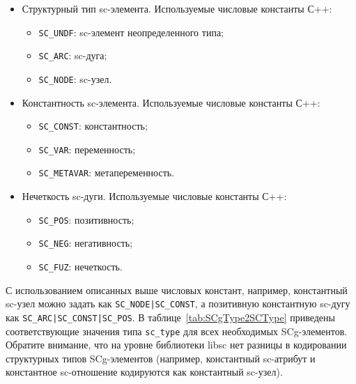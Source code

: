 \begin{itemize}
\item Структурный тип sc-элемента. Используемые числовые константы
  С++:
  \begin{itemize}
  \item \lstinline{SC_UNDF}: sc-элемент неопределенного типа;
  \item \lstinline{SC_ARC}: sc-дуга;
  \item \lstinline{SC_NODE}: sc-узел.
  \end{itemize}

\item Константность sc-элемента. Используемые числовые константы С++:
  \begin{itemize}
  \item \lstinline{SC_CONST}: константность;
  \item \lstinline{SC_VAR}: переменность;
  \item \lstinline{SC_METAVAR}: метапеременность.
  \end{itemize}

\item Нечеткость sc-дуги. Используемые числовые константы С++:
  \begin{itemize}
  \item \lstinline{SC_POS}: позитивность;
  \item \lstinline{SC_NEG}: негативность;
  \item \lstinline{SC_FUZ}: нечеткость.
  \end{itemize}
\end{itemize}

С использованием описанных выше числовых констант, например,
константный sc-узел можно задать как \lstinline{SC_NODE|SC_CONST}, а
позитивную константную sc-дугу как
\lstinline{SC_ARC|SC_CONST|SC_POS}. В таблице~\ref{tab:SCgType2SCType}
приведены соответствующие значения типа \lstinline{sc_type} для всех
необходимых SCg-элементов. Обратите внимание, что на уровне библиотеки
libsc нет разницы в кодировании структурных типов SCg-элементов
(например, константный sc-атрибут и константное sc-отношение
кодируются как константный sc-узел).

